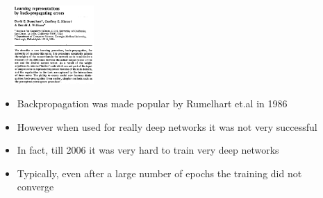 
\begin{frame}
	\begin{columns}
		
		\begin{overlayarea}{\textwidth}{\textheight}
			\vspace{1cm}
			\begin{center}		
				
			\end{center}
		\end{overlayarea}
		
		\begin{overlayarea}{\textwidth}{\textheight}
			\vspace{0.1cm}
			\includegraphics[width=4cm,height=3cm]{images/BackProp_paper.png}
			\begin{itemize}[<+(1)->]
				\justifying
				\item Backpropagation was made popular by Rumelhart et.al in 1986
				\item However when used for really deep networks it was not very successful
				\item In fact, till 2006 it was very hard to train very deep networks
				\item Typically, even after a large number of epochs the training did not converge
			\end{itemize}
			
		\end{overlayarea}
	\end{columns}
	
\end{frame}

